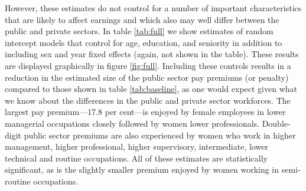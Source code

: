 \documentclass[a4paper,11pt,titlepage]{article}
\begin{document}
However, these estimates do not control for a number of important characteristics
that are likely to affect earnings and which also may well differ between the public and
private sectors. In table \ref{tab:full} we show estimates of random intercept models that control
for age, education, and seniority in addition to including sex and year fixed effects (again, not shown in the table). These results are displayed graphically in figure \ref{fig:full}. Including these controls results in a reduction in the estimated size of the public sector pay premiums (or penalty) compared to those shown in table \ref{tab:baseline}, as one would expect given what we know about the differences in the public and private sector workforces.  The largest pay premium---17.8 per cent---is enjoyed by female employees in lower managerial occupations closely followed by women lower professionals.
Double-digit public sector premiums are also experienced by women who work in higher management, higher professional, higher supervisory, intermediate, lower technical and routine occupations.  All of these estimates are statistically significant, as is the slightly smaller premium enjoyed by women working in semi-routine occupations.
\end{document}
